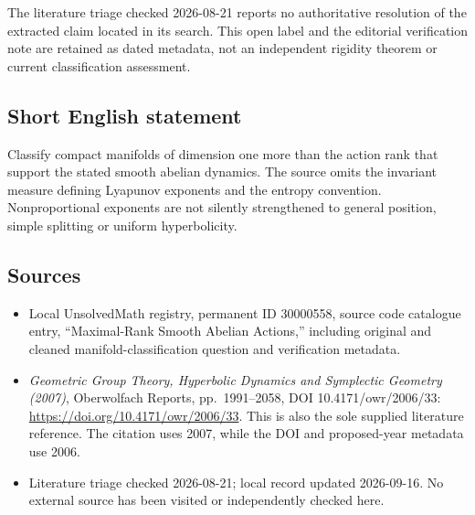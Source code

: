 \documentclass[11pt]{article}
\begin{document}
The literature triage checked 2026-08-21 reports no authoritative resolution of the extracted claim located in its search. This open label and the editorial verification note are retained as dated metadata, not an independent rigidity theorem or current classification assessment.
\subsection{Short English statement}
Classify compact manifolds of dimension one more than the action rank that support the stated smooth abelian dynamics. The source omits the invariant measure defining Lyapunov exponents and the entropy convention. Nonproportional exponents are not silently strengthened to general position, simple splitting or uniform hyperbolicity.
\subsection{Sources}
\begin{itemize}
\item Local UnsolvedMath registry, permanent ID 30000558, source code catalogue entry, ``Maximal-Rank Smooth Abelian Actions,'' including original and cleaned manifold-classification question and verification metadata.
\item \emph{Geometric Group Theory, Hyperbolic Dynamics and Symplectic Geometry (2007)}, Oberwolfach Reports, pp.\ 1991--2058, DOI 10.4171/owr/2006/33: \url{https://doi.org/10.4171/owr/2006/33}. This is also the sole supplied literature reference. The citation uses 2007, while the DOI and proposed-year metadata use 2006.
\item Literature triage checked 2026-08-21; local record updated 2026-09-16. No external source has been visited or independently checked here.
\end{itemize}
\end{document}
